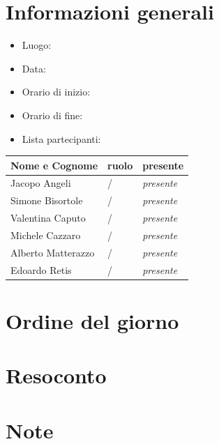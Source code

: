 \documentclass[12pt]{article}
\begin{document}
\newpage

\section{Informazioni generali}
\begin{itemize}
    \item Luogo: \meetPlace
    \item Data: \meetDate
    \item Orario di inizio: \meetStart
    \item Orario di fine: \meetEnd
    \item Lista partecipanti:
\end{itemize}
\begin{center}
\begin{tabularx}{0.8\textwidth} { 
   >{\raggedright\arraybackslash}X 
   >{\centering\arraybackslash}X 
   >{\raggedleft\arraybackslash}X  }
\hline
    \textbf{Nome e Cognome} &      \textbf{ruolo}   &   \textbf{presente}\\
\hline
    Jacopo Angeli       &   /   &   \emph{presente}\\
    Simone Bisortole    &   /   &   \emph{presente}\\
    Valentina Caputo    &   /   &   \emph{presente}\\
    Michele Cazzaro     &   /   &   \emph{presente}\\
    Alberto Matterazzo  &   /   &   \emph{presente}\\
    Edoardo Retis       &   /   &   \emph{presente}\\
\end{tabularx}
\end{center}

\section{Ordine del giorno}
\meetAims

\section{Resoconto}
\meetReport

\section{Note}
\meetNotes
\end{document}
